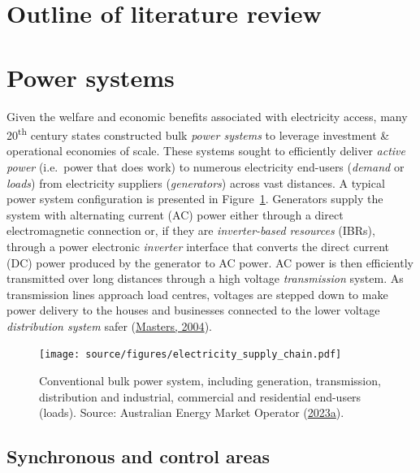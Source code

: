 \documentclass[12pt,a4paper,]{report}
\begin{document}
\hypertarget{outline-of-literature-review}{%
\section{Outline of literature
review}\label{outline-of-literature-review}}

\hypertarget{sec:lit_review-power_systems}{%
\section{Power systems}\label{sec:lit_review-power_systems}}

Given the welfare and economic benefits associated with electricity
access, many 20\textsuperscript{th} century states constructed bulk
\emph{power systems} to leverage investment \& operational economies of
scale. These systems sought to efficiently deliver \emph{active power}
(i.e.~power that does work) to numerous electricity end-users
(\emph{demand} or \emph{loads}) from electricity suppliers
(\emph{generators}) across vast distances. A typical power system
configuration is presented in Figure~\ref{fig:elec_supply_chain}.
Generators supply the system with alternating current (AC) power either
through a direct electromagnetic connection or, if they are
\emph{inverter-based resources} (IBRs), through a power electronic
\emph{inverter} interface that converts the direct current (DC) power
produced by the generator to AC power. AC power is then efficiently
transmitted over long distances through a high voltage
\emph{transmission} system. As transmission lines approach load centres,
voltages are stepped down to make power delivery to the houses and
businesses connected to the lower voltage \emph{distribution system}
safer
(\protect\hyperlink{ref-mastersRenewableEfficientElectric2004}{Masters,
2004}).

\begin{figure}
\hypertarget{fig:elec_supply_chain}{%
\centering
\texttt{[image: source/figures/electricity\_supply\_chain.pdf]}
\caption[The bulk power system as an electricity supply
chain]{Conventional bulk power system, including generation,
transmission, distribution and industrial, commercial and residential
end-users (loads). Source: Australian Energy Market Operator
(\protect\hyperlink{ref-australianenergymarketoperatorIndustryOverview2023}{2023a}).}\label{fig:elec_supply_chain}
}
\end{figure}

\hypertarget{synchronous-and-control-areas}{%
\subsection{Synchronous and control
areas}\label{synchronous-and-control-areas}}
\end{document}
